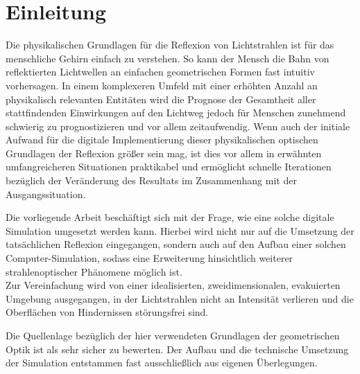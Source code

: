 \chapter{Einleitung}
Die physikalischen Grundlagen für die Reflexion von Lichtstrahlen 
ist für das menschliche Gehirn einfach zu verstehen. 
So kann der Mensch die Bahn von reflektierten Lichtwellen 
an einfachen geometrischen Formen fast intuitiv vorhersagen. 
In einem komplexeren Umfeld mit einer erhöhten Anzahl an 
physikalisch relevanten Entitäten wird die Prognose 
der Gesamtheit aller stattfindenden Einwirkungen auf den 
Lichtweg jedoch für Menschen zunehmend schwierig 
zu prognostizieren und vor allem zeitaufwendig.
Wenn auch der initiale Aufwand für die digitale Implementierung dieser physikalischen 
optischen Grundlagen der Reflexion größer sein mag, 
ist dies vor allem in erwähnten umfangreicheren Situationen praktikabel und ermöglicht 
schnelle Iterationen bezüglich der Veränderung 
des Resultats im Zusammenhang mit der Ausgangssituation. 

Die vorliegende Arbeit beschäftigt sich mit der Frage, 
wie eine solche digitale Simulation umgesetzt werden kann. 
Hierbei wird nicht nur auf die Umsetzung der tatsächlichen 
Reflexion eingegangen, sondern auch auf 
den Aufbau einer solchen Computer-Simulation, 
sodass eine Erweiterung hinsichtlich weiterer strahlenoptischer 
Phänomene möglich ist. \\ 
Zur Vereinfachung wird von einer idealisierten, zweidimensionalen, 
evakuierten Umgebung ausgegangen, 
in der Lichtstrahlen nicht an Intensität verlieren
und die Oberflächen von Hindernissen störungsfrei sind.

Die Quellenlage bezüglich der hier verwendeten Grundlagen der geometrischen Optik ist als sehr sicher zu bewerten. 
Der Aufbau und die technische Umsetzung der Simulation entstammen fast ausschließlich aus eigenen Überlegungen.